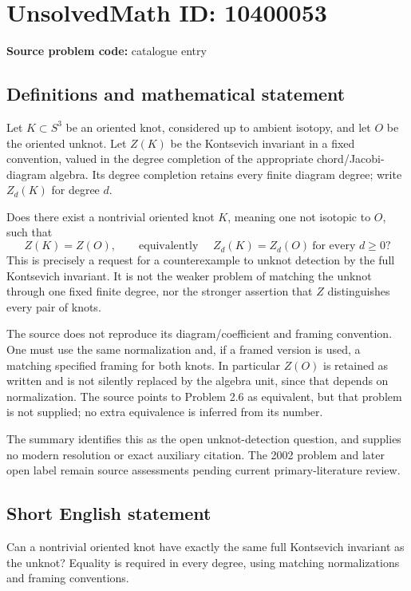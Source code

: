 \documentclass[11pt]{article}
\begin{document}
\section*{UnsolvedMath ID: 10400053}
\textbf{Source problem code:} catalogue entry
\subsection{Definitions and mathematical statement}
Let \(K\subset S^3\) be an oriented knot, considered up to ambient isotopy, and let \(O\) be the oriented unknot. Let \(Z(K)\) be the Kontsevich invariant in a fixed convention, valued in the degree completion of the appropriate chord/Jacobi-diagram algebra. Its degree completion retains every finite diagram degree; write \(Z_d(K)\) for degree \(d\).

Does there exist a nontrivial oriented knot \(K\), meaning one not isotopic to \(O\), such that
\[
 Z(K)=Z(O),\qquad\text{equivalently }\quad
 Z_d(K)=Z_d(O)\ \text{for every }d\ge0?
\]
This is precisely a request for a counterexample to unknot detection by the full Kontsevich invariant. It is not the weaker problem of matching the unknot through one fixed finite degree, nor the stronger assertion that \(Z\) distinguishes every pair of knots.

The source does not reproduce its diagram/coefficient and framing convention. One must use the same normalization and, if a framed version is used, a matching specified framing for both knots. In particular \(Z(O)\) is retained as written and is not silently replaced by the algebra unit, since that depends on normalization. The source points to Problem 2.6 as equivalent, but that problem is not supplied; no extra equivalence is inferred from its number.

The summary identifies this as the open unknot-detection question, and supplies no modern resolution or exact auxiliary citation. The 2002 problem and later open label remain source assessments pending current primary-literature review.
\subsection{Short English statement}
Can a nontrivial oriented knot have exactly the same full Kontsevich invariant as the unknot? Equality is required in every degree, using matching normalizations and framing conventions.
\end{document}
